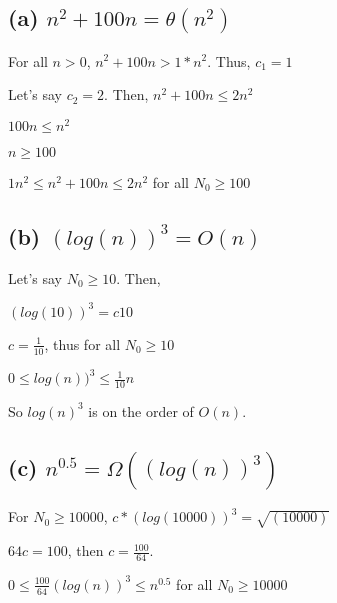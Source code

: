 \documentclass[]{../../ncmathy}
\begin{document}
\subsection{(a) $n^2 + 100 n = \theta(n^2)$}

For all $n>0$, $n^2 + 100n > 1* n^2$. Thus, $c_1 = 1$

Let's say $c_2 = 2$. Then,
$n^2 +100n\leq  2 n^2$

$100n \leq n^2$

$n \geq 100$

$ 1 n^2 \leq n^2 + 100n \leq 2 n^2$ for all $N_0 \geq 100$

\subsection{(b) $ (log(n))^3 = O(n)$}

Let's say $N_0 \geq 10$. Then,

$(log(10))^3 = c 10$

$  c = \frac{1}{10}$, thus for all $N_0 \geq 10$

$0 \leq log(n))^3 \leq \frac{1}{10} n$

So $log(n)^3$ is on the order of $O(n)$.

\subsection{(c) $n^{0.5} = \Omega((log(n))^3)$}

For $N_0 \geq 10000$, $ c*(log(10000))^3 = \sqrt{(10000)}$

$64 c = 100$, then $c = \frac{100}{64}$. 

$0 \leq \frac{100}{64} (log(n))^3 \leq n^{0.5}$ for all $N_0 \geq 10000$
\end{document}
